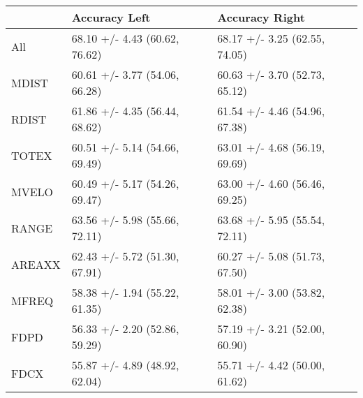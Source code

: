 \begin{tabular}{lll}
\toprule
{} &                  Accuracy Left &                 Accuracy Right \\
\midrule
All    &  68.10 +/- 4.43 (60.62, 76.62) &  68.17 +/- 3.25 (62.55, 74.05) \\
MDIST  &  60.61 +/- 3.77 (54.06, 66.28) &  60.63 +/- 3.70 (52.73, 65.12) \\
RDIST  &  61.86 +/- 4.35 (56.44, 68.62) &  61.54 +/- 4.46 (54.96, 67.38) \\
TOTEX  &  60.51 +/- 5.14 (54.66, 69.49) &  63.01 +/- 4.68 (56.19, 69.69) \\
MVELO  &  60.49 +/- 5.17 (54.26, 69.47) &  63.00 +/- 4.60 (56.46, 69.25) \\
RANGE  &  63.56 +/- 5.98 (55.66, 72.11) &  63.68 +/- 5.95 (55.54, 72.11) \\
AREAXX &  62.43 +/- 5.72 (51.30, 67.91) &  60.27 +/- 5.08 (51.73, 67.50) \\
MFREQ  &  58.38 +/- 1.94 (55.22, 61.35) &  58.01 +/- 3.00 (53.82, 62.38) \\
FDPD   &  56.33 +/- 2.20 (52.86, 59.29) &  57.19 +/- 3.21 (52.00, 60.90) \\
FDCX   &  55.87 +/- 4.89 (48.92, 62.04) &  55.71 +/- 4.42 (50.00, 61.62) \\
\bottomrule
\end{tabular}
